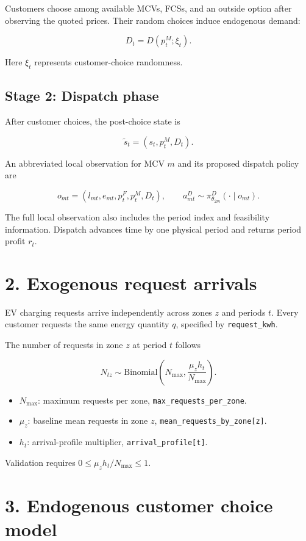 \documentclass[11pt,letterpaper]{article}
\begin{document}
Customers choose among available MCVs, FCSs, and an outside option after observing the quoted prices. Their random choices induce endogenous demand:

\[
D_t=D(p_t^M;\xi_t).
\]


Here $\xi_t$ represents customer-choice randomness.

\subsection*{Stage 2: Dispatch phase}


After customer choices, the post-choice state is

\[
\widetilde{s}_t=(s_t,p_t^M,D_t).
\]


An abbreviated local observation for MCV $m$ and its proposed dispatch policy are

\[
o_{mt}=(l_{mt},e_{mt},p_t^F,p_t^M,D_t),
\qquad
a^D_{mt}\sim\pi^D_{\theta_{2m}}(\cdot\mid o_{mt}).
\]


The full local observation also includes the period index and feasibility information. Dispatch advances time by one physical period and returns period profit $r_t$.

\section*{2. Exogenous request arrivals}


EV charging requests arrive independently across zones $z$ and periods $t$. Every customer requests the same energy quantity $q$, specified by \texttt{request\_kwh}.

The number of requests in zone $z$ at period $t$ follows

\[
N_{tz}\sim\mathrm{Binomial}
\left(
N_{\max},\frac{\mu_z h_t}{N_{\max}}
\right).
\]


\begin{itemize}
\setlength{\itemsep}{1pt}
\item $N_{\max}$: maximum requests per zone, \texttt{max\_requests\_per\_zone}.
\item $\mu_z$: baseline mean requests in zone $z$, \texttt{mean\_requests\_by\_zone[z]}.
\item $h_t$: arrival-profile multiplier, \texttt{arrival\_profile[t]}.
\end{itemize}


Validation requires $0\leq\mu_z h_t/N_{\max}\leq1$.

\section*{3. Endogenous customer choice model}
\end{document}
